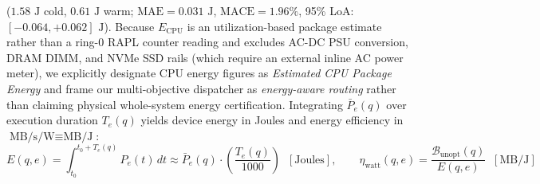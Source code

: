\documentclass[10pt,a4paper]{article}
\begin{document}
\begin{enumerate}[leftmargin=1.5em,itemsep=3pt]
($1.58\text{ J}$ cold, $0.61\text{ J}$ warm; $\text{MAE} = 0.031\text{ J}$, $\text{MACE} = 1.96\%$, 95\% LoA: $[-0.064, +0.062]\text{ J}$). Because $E_{\text{CPU}}$ is an utilization-based package estimate rather than a ring-0 RAPL counter reading and excludes AC-DC PSU conversion, DRAM DIMM, and NVMe SSD rails (which require an external inline AC power meter), we explicitly designate CPU energy figures as \emph{Estimated CPU Package Energy} and frame our multi-objective dispatcher as \emph{energy-aware routing} rather than claiming physical whole-system energy certification. Integrating $\bar{P}_e(q)$ over execution duration $T_e(q)$ yields device energy in Joules and energy efficiency in $\text{MB/s/W} \equiv \text{MB/J}$:
\begin{equation}
        E(q, e) = \int_{t_0}^{t_0 + T_e(q)} P_e(t)\,dt \approx \bar{P}_e(q) \cdot \left(\frac{T_e(q)}{1000}\right) \;\; [\text{Joules}], \qquad \eta_{\text{watt}}(q, e) = \frac{\mathcal{B}_{\text{unopt}}(q)}{E(q, e)} \;\; [\text{MB/J}]
    \end{equation}
\end{enumerate}
\end{document}
